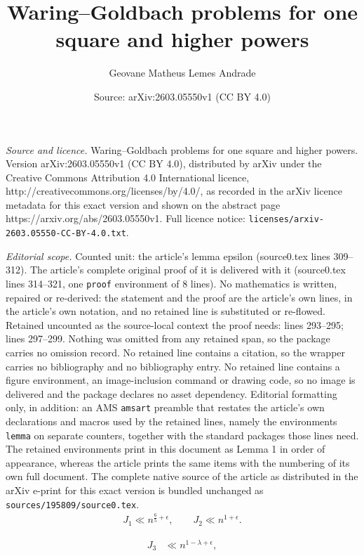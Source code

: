\documentclass[10pt,a4paper]{amsart}
\title{Waring–Goldbach problems for one square and higher powers}
\author{Geovane Matheus Lemes Andrade}
\date{Source: arXiv:2603.05550v1 (CC BY 4.0)}
\begin{document}
\maketitle

\noindent\emph{Source and licence.} Waring–Goldbach problems for one square and higher powers. Version arXiv:2603.05550v1 (CC BY 4.0), distributed by arXiv under the Creative Commons Attribution 4.0 International licence, http://creativecommons.org/licenses/by/4.0/, as recorded in the arXiv licence metadata for this exact version and shown on the abstract page https://arxiv.org/abs/2603.05550v1. Full licence notice: \texttt{licenses/arxiv-2603.05550-CC-BY-4.0.txt}.\par\smallskip

\noindent\textit{Editorial scope.} Counted unit: the article's lemma epsilon (source0.tex lines 309--312). The article's complete original proof of it is delivered with it (source0.tex lines 314--321, one \texttt{proof} environment of 8 lines). No mathematics is written, repaired or re-derived: the statement and the proof are the article's own lines, in the article's own notation, and no retained line is substituted or re-flowed.  Retained uncounted as the source-local context the proof needs: lines 293--295; lines 297--299.  Nothing was omitted from any retained span, so the package carries no omission record.  No retained line contains a citation, so the wrapper carries no bibliography and no bibliography entry.  No retained line contains a figure environment, an image-inclusion command or drawing code, so no image is delivered and the package declares no asset dependency.  Editorial formatting only, in addition: an AMS \texttt{amsart} preamble that restates the article's own declarations and macros used by the retained lines, namely the environments \texttt{lemma} on separate counters, together with the standard packages those lines need.  The retained environments print in this document as Lemma 1 in order of appearance, whereas the article prints the same items with the numbering of its own full document.  The complete native source of the article as distributed in the arXiv e-print for this exact version is bundled unchanged as \texttt{sources/195809/source0.tex}.
\begin{align}\label{j1j2}
    J_1 \ll n^{\frac{6}{5}+\epsilon}, \qquad J_2 \ll n^{1+\epsilon}.
\end{align}

\begin{align}\label{j3j4}
    J_3 &\ll n^{1-\lambda+\epsilon},
\end{align}
\end{document}
